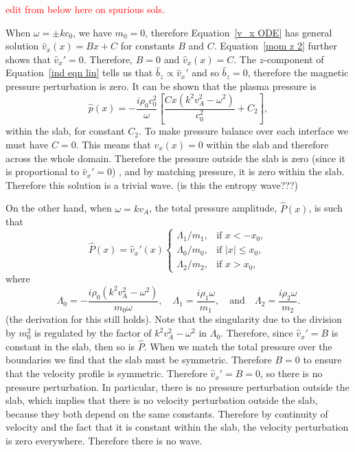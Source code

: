\documentclass[12pt]{../style-files/ociamthesis}
\begin{document}
\textcolor{red}{edit from below here on spurious sols.}

When $\omega = \pm kc_0$, we have $m_0 = 0$, therefore Equation~\eqref{v_x ODE} has general solution $\hat{v}_x(x) = Bx + C$ for constants $B$ and $C$. Equation~\eqref{mom z 2} further shows that  $\hat{v}_x' = 0$. Therefore, $B = 0$ and $\hat{v}_x(x) = C$. The $z$-component of Equation~\eqref{ind eqn lin} tells us that $\hat{b}_z \propto \hat{v}_x'$ and so $\hat{b}_z = 0$, therefore the magnetic pressure perturbation is zero. It can be shown that the plasma pressure is
\begin{equation}
\hat{p}(x) = - \frac{i\rho_0c_0^2}{\omega}\left[\frac{Cx(k^2v_A^2 - \omega^2)}{c_0^2} + C_2\right],
\end{equation}
within the slab, for constant $C_2$. To make pressure balance over each interface we must have $C=0$. This means that $v_x(x)=0$ within the slab and therefore across the whole domain. Therefore the pressure outside the slab is zero (since it is proportional to $\hat{v}_x' = 0$) , and by matching pressure, it is zero within the slab. Therefore this solution is a trivial wave. (is this the entropy wave???)

On the other hand, when $\omega = kv_A$, the total pressure amplitude, $\hat{P}(x)$, is such that
\begin{equation}
\widehat{P}(x)=\widehat{v}_x'(x)
\begin{cases}
\Lambda_1/m_1, & \text{if } x<-x_0, \\
\Lambda_0/m_0, & \text{if }|x|\leq{}x_0, \\
\Lambda_2/m_2, & \text{if }x>x_0,
\end{cases}
\end{equation}
where
\begin{equation}
\Lambda_0=-\frac{i\rho_0(k^2v_\textrm{A}^2-\omega^2)}{m_0\omega}, \quad \Lambda_1=\frac{i\rho_1\omega}{m_1}, \quad \text{and} \quad \Lambda_2=\frac{i\rho_2\omega}{m_2}. \label{Lambdas}
\end{equation}
(the derivation for this still holds). Note that the singularity due to the division by $m_0^2$ is regulated by the factor of $k^2v_A^2 - \omega^2$ in $\Lambda_0$. Therefore, since $\hat{v}_x' = B$ is constant in the slab, then so is $\hat{P}$. When we match the total pressure over the boundaries we find that the slab must be symmetric. Therefore $B=0$ to ensure that the velocity profile is symmetric. Therefore $\hat{v}_x' = B = 0$, so there is no pressure perturbation. In particular, there is no pressure perturbation outside the slab, which implies that there is no velocity perturbation outside the slab, because they both depend on the same constants. Therefore by continuity of velocity and the fact that it is constant within the slab, the velocity perturbation is zero everywhere. Therefore there is no wave.
\end{document}
